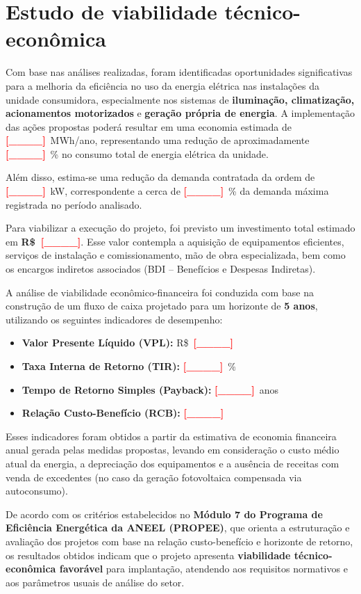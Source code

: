 \chapter{Estudo de viabilidade técnico-econômica}



Com base nas análises realizadas, foram identificadas oportunidades significativas para a melhoria da eficiência no uso da energia elétrica nas instalações da unidade consumidora, especialmente nos sistemas de \textbf{iluminação, climatização, acionamentos motorizados} e \textbf{geração própria de energia}. A implementação das ações propostas poderá resultar em uma economia estimada de \textbf{\textcolor{red}{[\_\_\_\_]}}~MWh/ano, representando uma redução de aproximadamente \textbf{\textcolor{red}{[\_\_\_\_]}}~\% no consumo total de energia elétrica da unidade.

Além disso, estima-se uma redução da demanda contratada da ordem de \textbf{\textcolor{red}{[\_\_\_\_]}}~kW, correspondente a cerca de \textbf{\textcolor{red}{[\_\_\_\_]}}~\% da demanda máxima registrada no período analisado.

Para viabilizar a execução do projeto, foi previsto um investimento total estimado em \textbf{R\$~\textcolor{red}{[\_\_\_\_]}}. Esse valor contempla a aquisição de equipamentos eficientes, serviços de instalação e comissionamento, mão de obra especializada, bem como os encargos indiretos associados (BDI – Benefícios e Despesas Indiretas).

A análise de viabilidade econômico-financeira foi conduzida com base na construção de um fluxo de caixa projetado para um horizonte de \textbf{5 anos}, utilizando os seguintes indicadores de desempenho:

\begin{itemize}
    \item \textbf{Valor Presente Líquido (VPL):} R\$~\textcolor{red}{\textbf{[\_\_\_\_]}}
    \item \textbf{Taxa Interna de Retorno (TIR):} \textcolor{red}{\textbf{[\_\_\_\_]}}~\%
    \item \textbf{Tempo de Retorno Simples (Payback):} \textcolor{red}{\textbf{[\_\_\_\_]}}~anos
    \item \textbf{Relação Custo-Benefício (RCB):} \textcolor{red}{\textbf{[\_\_\_\_]}}
\end{itemize}

Esses indicadores foram obtidos a partir da estimativa de economia financeira anual gerada pelas medidas propostas, levando em consideração o custo médio atual da energia, a depreciação dos equipamentos e a ausência de receitas com venda de excedentes (no caso da geração fotovoltaica compensada via autoconsumo).

De acordo com os critérios estabelecidos no \textbf{Módulo 7 do Programa de Eficiência Energética da ANEEL (PROPEE)}, que orienta a estruturação e avaliação dos projetos com base na relação custo-benefício e horizonte de retorno, os resultados obtidos indicam que o projeto apresenta \textbf{viabilidade técnico-econômica favorável} para implantação, atendendo aos requisitos normativos e aos parâmetros usuais de análise do setor.

